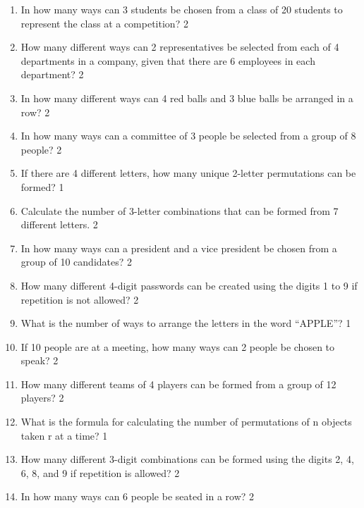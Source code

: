 \documentclass[a4paper,oneside, margin=1.4in]{book}
\begin{document}
\begin{enumerate}
\item
In how many ways can 3 students be chosen from a class of 20 students to represent the class at a competition? \hfill 2

\item
How many different ways can 2 representatives be selected from each of 4 departments in a company, given that there are 6 employees in each department? \hfill 2


\item
In how many different ways can 4 red balls and 3 blue balls be arranged in a row? \hfill 2


\item In how many ways can a committee of 3 people be selected from a group of 8 people? \hfill 2

\item If there are 4 different letters, how many unique 2-letter permutations can be formed? \hfill 1

\item Calculate the number of 3-letter combinations that can be formed from 7 different letters. \hfill 2

\item In how many ways can a president and a vice president be chosen from a group of 10 candidates? \hfill 2

\item How many different 4-digit passwords can be created using the digits 1 to 9 if repetition is not allowed? \hfill 2

\item What is the number of ways to arrange the letters in the word “APPLE”? \hfill 1

\item If 10 people are at a meeting, how many ways can 2 people be chosen to speak? \hfill 2

\item How many different teams of 4 players can be formed from a group of 12 players? \hfill 2

\item What is the formula for calculating the number of permutations of n objects taken r at a time? \hfill 1

\item How many different 3-digit combinations can be formed using the digits 2, 4, 6, 8, and 9 if repetition is allowed? \hfill 2

\item In how many ways can 6 people be seated in a row? \hfill 2


\end{enumerate}
\end{document}
